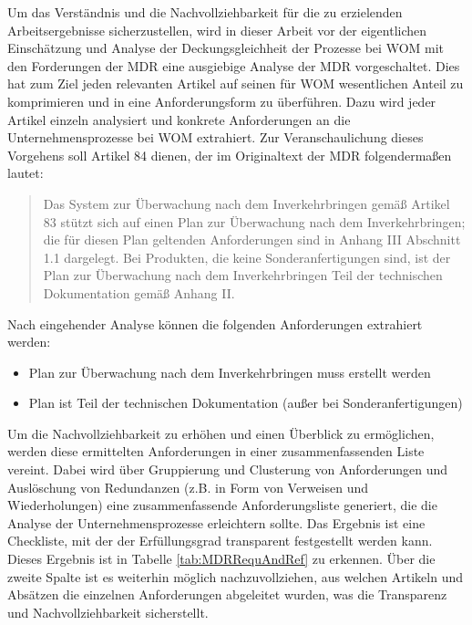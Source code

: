 \documentclass[a4paper,12pt]{report}
\begin{document}
Um das Verständnis und die Nachvollziehbarkeit für die zu erzielenden Arbeitsergebnisse sicherzustellen, wird in dieser Arbeit vor der eigentlichen Einschätzung und Analyse der Deckungsgleichheit der Prozesse bei WOM mit den Forderungen der MDR eine ausgiebige Analyse der MDR vorgeschaltet. Dies hat zum Ziel jeden relevanten Artikel auf seinen für WOM wesentlichen Anteil zu komprimieren und in eine Anforderungsform zu überführen. Dazu wird jeder Artikel einzeln analysiert und konkrete Anforderungen an die Unternehmensprozesse bei WOM extrahiert. Zur Veranschaulichung dieses Vorgehens soll Artikel 84 dienen, der im Originaltext der MDR folgendermaßen lautet:
\begin{quote}
Das System zur Überwachung nach dem Inverkehrbringen gemäß Artikel 83 stützt sich auf einen Plan zur Überwachung nach dem Inverkehrbringen; die für diesen Plan geltenden Anforderungen sind in Anhang III Abschnitt 1.1 dargelegt. Bei Produkten, die keine Sonderanfertigungen sind, ist der Plan zur Überwachung nach dem Inverkehrbringen Teil der technischen Dokumentation gemäß Anhang II.
\end{quote}
Nach eingehender Analyse können die folgenden Anforderungen extrahiert werden:
\begin{itemize}
\item Plan zur Überwachung nach dem Inverkehrbringen muss erstellt werden
\item Plan ist Teil der technischen Dokumentation (außer bei Sonderanfertigungen)
\end{itemize}
Um die Nachvollziehbarkeit zu erhöhen und einen Überblick zu ermöglichen, werden diese ermittelten Anforderungen in einer zusammenfassenden Liste vereint. Dabei wird über Gruppierung und Clusterung von Anforderungen und Auslöschung von Redundanzen (z.B. in Form von Verweisen und Wiederholungen) eine zusammenfassende Anforderungsliste generiert, die die Analyse der Unternehmensprozesse erleichtern sollte. Das Ergebnis ist eine Checkliste, mit der der Erfüllungsgrad transparent festgestellt werden kann. Dieses Ergebnis ist in Tabelle \ref{tab:MDRRequAndRef} zu erkennen. Über die zweite Spalte ist es weiterhin möglich nachzuvollziehen, aus welchen Artikeln und Absätzen die einzelnen Anforderungen abgeleitet wurden, was die Transparenz und Nachvollziehbarkeit sicherstellt.
\end{document}

